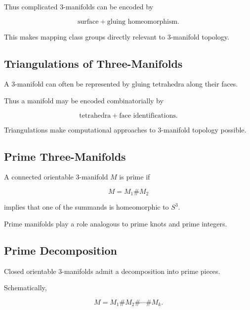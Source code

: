 Thus complicated \(3\)-manifolds can be encoded by

\[
\boxed{
\text{surface}
+
\text{gluing homeomorphism}.
}
\]

This makes mapping class groups directly relevant to \(3\)-manifold
topology.

\subsection{Triangulations of Three-Manifolds}
\label{subsec:triangulations-three-manifolds}

A \(3\)-manifold can often be represented by gluing tetrahedra along their
faces.

Thus a manifold may be encoded combinatorially by

\[
\boxed{
\text{tetrahedra}
+
\text{face identifications}.
}
\]

Triangulations make computational approaches to \(3\)-manifold topology
possible.

\subsection{Prime Three-Manifolds}
\label{subsec:prime-three-manifolds}

A connected orientable \(3\)-manifold \(M\) is prime if

\[
M=M_1\#M_2
\]

implies that one of the summands is homeomorphic to \(S^3\).

Prime manifolds play a role analogous to prime knots and prime integers.

\subsection{Prime Decomposition}
\label{subsec:prime-decomposition-three-manifolds}

Closed orientable \(3\)-manifolds admit a decomposition into prime pieces.

Schematically,

\[
\boxed{
M
=
M_1\#M_2\#\cdots\#M_k.
}
\]

